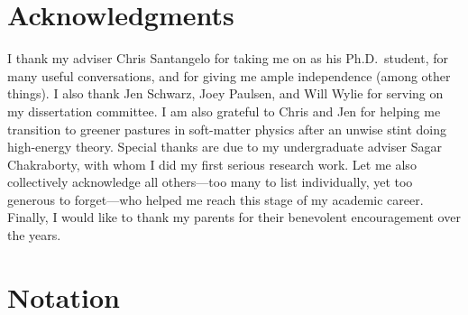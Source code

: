 \newpage\thispagestyle{empty}
\chapter*{Acknowledgments}

I thank my adviser Chris Santangelo for taking me on as his Ph.D.~student, for many useful conversations, and for giving me ample independence (among other things).
I also thank Jen Schwarz, Joey Paulsen, and Will Wylie for serving on my dissertation committee.
I am also grateful to Chris and Jen for helping me transition to greener pastures in soft-matter physics after an unwise stint doing high-energy theory.
Special thanks are due to my undergraduate adviser Sagar Chakraborty, with whom I did my first serious research work.
Let me also collectively acknowledge all others---too many to list individually, yet too generous to forget---who helped me reach this stage of my academic career.
Finally, I would like to thank my parents for their benevolent encouragement over the years.

\ifdeadtree
  \blankpage
\fi


\newpage\pagestyle{headings}

\ifsustyle
  \relax
\else
  \setlength{\cftbeforechapterskip}{0.5em}
\fi

\setcounter{tocdepth}{2}

\tableofcontents*


\chapter*{Notation}




\mainmatter

\pagestyle{headings}






\ifsustyle
  
\fi
% 

